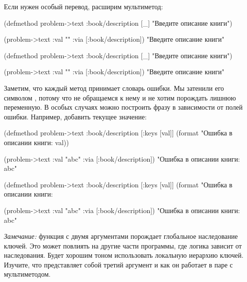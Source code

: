\fi

\noindent
Если нужен особый перевод, расширим мультиметод:

\ifnarrow

\begin{clojure}
(defmethod problem->text
  :book/description [_]
  "Введите описание книги")

(problem->text
  {:val "" :via [:book/description]})
"Введите описание книги"
\end{clojure}

\else

\begin{clojure}
(defmethod problem->text :book/description [_]
  "Введите описание книги")

(problem->text {:val "" :via [:book/description]})
"Введите описание книги"
\end{clojure}

\fi


Заметим, что каждый метод принимает словарь ошибки. Мы затенили его символом
\code{\_}, потому что не обращаемся к нему и не хотим порождать лишнюю
переменную. В особых случаях можно построить фразу в зависимости от полей
ошибки. Например, добавить текущее значение:

\ifnarrow

\begin{clojure}
(defmethod problem->text
  :book/description
  [{:keys [val]}]
  (format "Ошибка в описании книги: %
    val))

(problem->text
  {:val "abc" :via [:book/description]})
"Ошибка в описании книги: abc"
\end{clojure}

\else

\begin{clojure}
(defmethod problem->text :book/description
  [{:keys [val]}]
  (format "Ошибка в описании книги: %

(problem->text {:val "abc" :via [:book/description]})
"Ошибка в описании книги: abc"
\end{clojure}

\fi

\emph{Замечание:} функция  с двумя аргументами порождает глобальное
наследование ключей. Это может повлиять на другие части программы, где логика
зависит от наследования. Будет хорошим тоном использовать локальную иерархию
ключей. Изучите, что представляет собой третий аргумент  и как он
работает в паре с мультиметодом.

